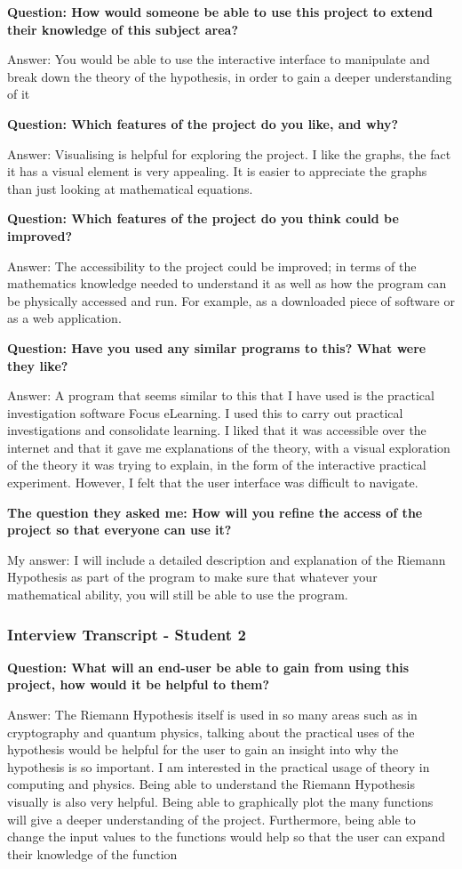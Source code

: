 \documentclass{article}
\begin{document}
\textbf{Question: How would someone be able to use this project to extend their knowledge of this subject area?}

Answer: You would be able to use the interactive interface to manipulate and break down the theory of the hypothesis, in order to gain a deeper understanding of it

\textbf{Question: Which features of the project do you like, and why?}

Answer: Visualising is helpful for exploring the project. I like the graphs, the fact it has a visual element is very appealing. It is easier to appreciate the graphs than just looking at mathematical equations.

\textbf{Question: Which features of the project do you think could be improved?}

Answer: The accessibility to the project could be improved; in terms of the mathematics knowledge needed to understand it as well as how the program can be physically accessed and run. For example, as a downloaded piece of software or as a web application.

\textbf{Question: Have you used any similar programs to this? What were they like?}

Answer: A program that seems similar to this that I have used is the practical investigation software Focus eLearning. I used this to carry out practical investigations and consolidate learning. I liked that it was accessible over the internet and that it gave me explanations of the theory, with a visual exploration of the theory it was trying to explain, in the form of the interactive practical experiment. However, I felt that the user interface was difficult to navigate.

\textbf{The question they asked me: How will you refine the access of the project so that everyone can use it?}

My answer: I will include a detailed description and explanation of the Riemann Hypothesis as part of the program to make sure that whatever your mathematical ability, you will still be able to use the program.

\subsubsection{Interview Transcript - Student 2}

\textbf{Question: What will an end-user be able to gain from using this project, how would it be helpful to them?}

Answer: The Riemann Hypothesis itself is used in so many areas such as in cryptography and quantum physics, talking about the practical uses of the hypothesis would be helpful for the user to gain an insight into why the hypothesis is so important.  I am interested in the practical usage of theory in computing and physics. Being able to understand the Riemann Hypothesis visually is also very helpful. Being able to graphically plot the many functions will give a deeper understanding of the project. Furthermore, being able to change the input values to the functions would help so that the user can expand their knowledge of the function
\end{document}
